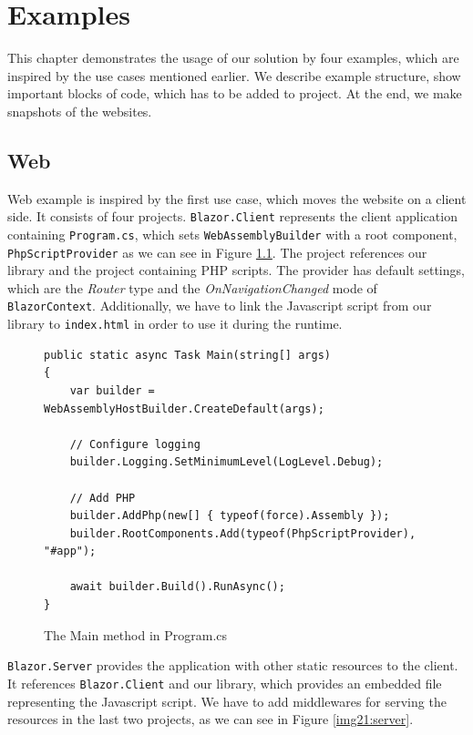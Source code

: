 \chapter{Examples}

This chapter demonstrates the usage of our solution by four examples, which are inspired by the use cases mentioned earlier.
We describe example structure, show important blocks of code, which has to be added to project.
At the end, we make snapshots of the websites.

\section{Web}

Web example is inspired by the first use case, which moves the website on a client side.
It consists of four projects. \texttt{Blazor.Client} represents the client application containing \texttt{Program.cs}, which sets \texttt{WebAssemblyBuilder} with a root component, \texttt{PhpScriptProvider} as we can see in Figure \ref{img20:program}.
The project references our library and the project containing PHP scripts.
The provider has default settings, which are the \textit{Router} type and the \textit{OnNavigationChanged} mode of \texttt{BlazorContext}.
Additionally, we have to link the Javascript script from our library to \texttt{index.html} in order to use it during the runtime.
\begin{figure}[H]
\begin{lstlisting}
public static async Task Main(string[] args)
{
	var builder = WebAssemblyHostBuilder.CreateDefault(args);

	// Configure logging
	builder.Logging.SetMinimumLevel(LogLevel.Debug);

	// Add PHP
	builder.AddPhp(new[] { typeof(force).Assembly });
	builder.RootComponents.Add(typeof(PhpScriptProvider), "#app");
            
	await builder.Build().RunAsync();
}
\end{lstlisting}
\caption{The Main method in Program.cs}
\label{img20:program}
\end{figure}
\par
\texttt{Blazor.Server} provides the application with other static resources to the client.
It references \texttt{Blazor.Client} and our library, which provides an embedded file representing the Javascript script.
We have to add middlewares for serving the resources in the last two projects, as we can see in Figure \ref{img21:server}.
\par
